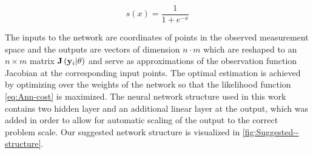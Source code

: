 	\[
	s\left(x\right)=\frac{1}{1+e^{-x}}
	\]
	
	The inputs to the network are coordinates of points in the observed measurement space and the outputs are vectors of dimension $n\cdot m$ which are reshaped to an $n\times m$ matrix $\mathbf{J}\left({\bf y}_{i}|\theta\right)$ and serve as approximations of the observation function Jacobian at the corresponding input points. The optimal estimation is achieved by optimizing over the weights of the network so that the likelihood function \cref{eq:Ann-cost} is maximized. The neural network structure used in this work contains two hidden layer and an additional linear layer at the output, which was added in order to allow for automatic scaling of the output to the correct problem scale. Our suggested network structure is visualized in \cref{fig:Suggested--structure}.
	
